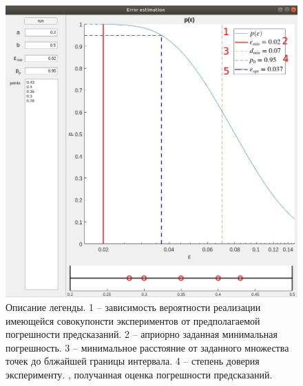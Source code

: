 \documentclass[a4paper,12pt]{article} %
\begin{document}
\begin{figure}[h!]
\begin{center}
\includegraphics[width=1\textwidth]{./pics/whole_window_numsLeg}
\end{center}
\caption{Описание легенды. 1 -- зависимость вероятности реализации имеющейся совокупонсти экспериментов от предполагаемой погрешности предсказаний. 2 -- априорно заданная минимальная погрешность. 3 -- минимальное расстояние от заданного множества точек до блжайшей границы интервала. 4 -- степень доверия эксперименту. , получанная оценка погрешности предсказаний.} \label{img:whole_numsLeg}
\end{figure}

\newpage

\printbibliography
\end{document}
